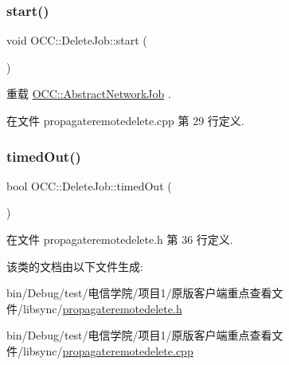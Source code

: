 \mbox{\label{class_o_c_c_1_1_delete_job_a48875d9957b8186fdf8ae59b77cd4195}} 
\subsubsection{\texorpdfstring{start()}{start()}}
{\footnotesize\ttfamily void O\+C\+C\+::\+Delete\+Job\+::start (\begin{DoxyParamCaption}{ }\end{DoxyParamCaption})\hspace{0.3cm}{\ttfamily [virtual]}}



重载 \hyperlink{class_o_c_c_1_1_abstract_network_job_a256f1b6b5d6f6252e83b3602743da64a}{O\+C\+C\+::\+Abstract\+Network\+Job} .



在文件 propagateremotedelete.\+cpp 第 29 行定义.

\mbox{\label{class_o_c_c_1_1_delete_job_a78d5ea040853243a5df75d483e8689b8}} 
\subsubsection{\texorpdfstring{timed\+Out()}{timedOut()}}
{\footnotesize\ttfamily bool O\+C\+C\+::\+Delete\+Job\+::timed\+Out (\begin{DoxyParamCaption}{ }\end{DoxyParamCaption})}



在文件 propagateremotedelete.\+h 第 36 行定义.



该类的文档由以下文件生成\+:\begin{DoxyCompactItemize}
\item 
bin/\+Debug/test/电信学院/项目1/原版客户端重点查看文件/libsync/\hyperlink{propagateremotedelete_8h}{propagateremotedelete.\+h}\item 
bin/\+Debug/test/电信学院/项目1/原版客户端重点查看文件/libsync/\hyperlink{propagateremotedelete_8cpp}{propagateremotedelete.\+cpp}\end{DoxyCompactItemize}
